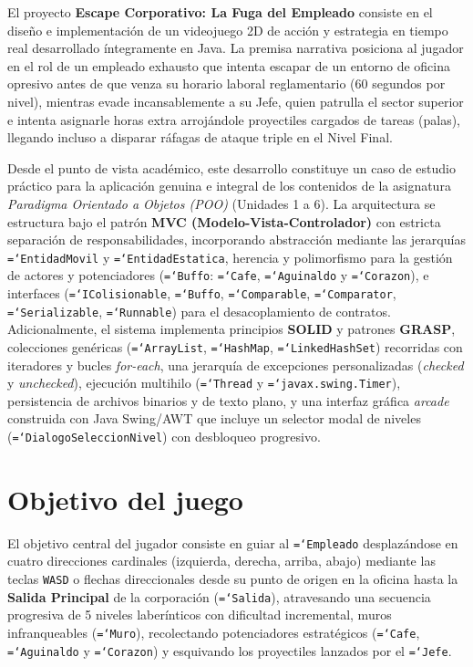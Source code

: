 \documentclass[12pt, a4paper]{article}
\DeclareRobustCommand{\code}[1]{\textcolor{codegreen}{\texttt{\hyphenchar\font=`\-#1}}}
\begin{document}
El proyecto \textbf{Escape Corporativo: La Fuga del Empleado} consiste en el diseño e implementación de un videojuego 2D de acción y estrategia en tiempo real desarrollado íntegramente en Java. La premisa narrativa posiciona al jugador en el rol de un empleado exhausto que intenta escapar de un entorno de oficina opresivo antes de que venza su horario laboral reglamentario (60 segundos por nivel), mientras evade incansablemente a su Jefe, quien patrulla el sector superior e intenta asignarle horas extra arrojándole proyectiles cargados de tareas (palas), llegando incluso a disparar ráfagas de ataque triple en el Nivel Final.

Desde el punto de vista académico, este desarrollo constituye un caso de estudio práctico para la aplicación genuina e integral de los contenidos de la asignatura \textit{Paradigma Orientado a Objetos (POO)} (Unidades 1 a 6). La arquitectura se estructura bajo el patrón \textbf{MVC (Modelo-Vista-Controlador)} con estricta separación de responsabilidades, incorporando abstracción mediante las jerarquías \code{EntidadMovil} y \code{EntidadEstatica}, herencia y polimorfismo para la gestión de actores y potenciadores (\code{Buffo}: \code{Cafe}, \code{Aguinaldo} y \code{Corazon}), e interfaces (\code{IColisionable}, \code{Buffo}, \code{Comparable}, \code{Comparator}, \code{Serializable}, \code{Runnable}) para el desacoplamiento de contratos. Adicionalmente, el sistema implementa principios \textbf{SOLID} y patrones \textbf{GRASP}, colecciones genéricas (\code{ArrayList}, \code{HashMap}, \code{LinkedHashSet}) recorridas con iteradores y bucles \textit{for-each}, una jerarquía de excepciones personalizadas (\textit{checked} y \textit{unchecked}), ejecución multihilo (\code{Thread} y \code{javax.swing.Timer}), persistencia de archivos binarios y de texto plano, y una interfaz gráfica \textit{arcade} construida con Java Swing/AWT que incluye un selector modal de niveles (\code{DialogoSeleccionNivel}) con desbloqueo progresivo.

\section{Objetivo del juego}

El objetivo central del jugador consiste en guiar al \code{Empleado} desplazándose en cuatro direcciones cardinales (izquierda, derecha, arriba, abajo) mediante las teclas \texttt{WASD} o flechas direccionales desde su punto de origen en la oficina hasta la \textbf{Salida Principal} de la corporación (\code{Salida}), atravesando una secuencia progresiva de 5 niveles laberínticos con dificultad incremental, muros infranqueables (\code{Muro}), recolectando potenciadores estratégicos (\code{Cafe}, \code{Aguinaldo} y \code{Corazon}) y esquivando los proyectiles lanzados por el \code{Jefe}.
\end{document}
